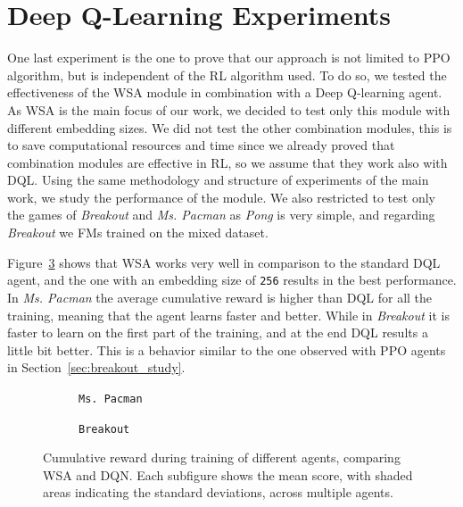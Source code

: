 \section{Deep Q-Learning Experiments}\label{sec:dqn}

One last experiment is the one to prove that our approach is not limited to PPO algorithm, but is independent of the RL algorithm used.
To do so, we tested the effectiveness of the WSA module in combination with a Deep Q-learning agent.
As WSA is the main focus of our work, we decided to test only this module with different embedding sizes.
We did not test the other combination modules, this is to save computational resources and time since we already proved that combination modules are effective in RL, so we assume that they work also with DQL\@.
Using the same methodology and structure of experiments of the main work, we study the performance of the module.
We also restricted to test only the games of \textit{Breakout} and \textit{Ms. Pacman} as \textit{Pong} is very simple, and regarding \textit{Breakout} we FMs trained on the mixed dataset.

Figure~\ref{fig:dqn_experiments} shows that WSA works very well in comparison to the standard DQL agent, and the one with an embedding size of \texttt{256} results in the best performance.
In \textit{Ms. Pacman} the average cumulative reward is higher than DQL for all the training, meaning that the agent learns faster and better.
While in \textit{Breakout} it is faster to learn on the first part of the training, and at the end DQL results a little bit better.
This is a behavior similar to the one observed with PPO agents in Section~\ref{sec:breakout_study}.


\begin{figure}[htbp]
    \centering
    \begin{subfigure}[b]{0.45\textwidth}
        \centering
        \fbox{\rule[-.5cm]{0cm}{4cm} \rule[-.5cm]{4cm}{0cm}}
        \caption{\texttt{Ms. Pacman}}
        \label{fig:mspacman_dqn}
    \end{subfigure}
    \hfill
    \begin{subfigure}[b]{0.45\textwidth}
        \centering
        \fbox{\rule[-.5cm]{0cm}{4cm} \rule[-.5cm]{4cm}{0cm}}
        \caption{\texttt{Breakout}}
        \label{fig:breakout_dqn}
    \end{subfigure}
    \caption{Cumulative reward during training of different agents, comparing WSA and DQN. Each subfigure shows the mean score, with shaded areas indicating the standard deviations, across multiple agents.}
    \label{fig:dqn_experiments}
\end{figure}



